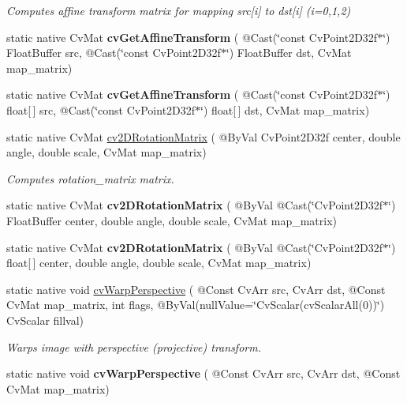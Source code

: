 \begin{DoxyCompactItemize}
\begin{DoxyCompactList}\small\item\em Computes affine transform matrix for mapping src\mbox{[}i\mbox{]} to dst\mbox{[}i\mbox{]} (i=0,1,2) \end{DoxyCompactList}\item 
static native Cv\+Mat {\bfseries cv\+Get\+Affine\+Transform} ( @Cast(\char`\"{}const Cv\+Point2\+D32f$\ast$\char`\"{}) Float\+Buffer src, @Cast(\char`\"{}const Cv\+Point2\+D32f$\ast$\char`\"{}) Float\+Buffer dst, Cv\+Mat map\+\_\+matrix)
\item 
static native Cv\+Mat {\bfseries cv\+Get\+Affine\+Transform} ( @Cast(\char`\"{}const Cv\+Point2\+D32f$\ast$\char`\"{}) float\mbox{[}$\,$\mbox{]} src, @Cast(\char`\"{}const Cv\+Point2\+D32f$\ast$\char`\"{}) float\mbox{[}$\,$\mbox{]} dst, Cv\+Mat map\+\_\+matrix)
\item 
static native Cv\+Mat \hyperlink{group__imgproc__c_ga8808b742ceec81dac792c107ef82fe13}{cv2\+D\+Rotation\+Matrix} ( @By\+Val Cv\+Point2\+D32f center, double angle, double scale, Cv\+Mat map\+\_\+matrix)
\begin{DoxyCompactList}\small\item\em Computes rotation\+\_\+matrix matrix. \end{DoxyCompactList}\item 
static native Cv\+Mat {\bfseries cv2\+D\+Rotation\+Matrix} ( @By\+Val @Cast(\char`\"{}Cv\+Point2\+D32f$\ast$\char`\"{}) Float\+Buffer center, double angle, double scale, Cv\+Mat map\+\_\+matrix)
\item 
static native Cv\+Mat {\bfseries cv2\+D\+Rotation\+Matrix} ( @By\+Val @Cast(\char`\"{}Cv\+Point2\+D32f$\ast$\char`\"{}) float\mbox{[}$\,$\mbox{]} center, double angle, double scale, Cv\+Mat map\+\_\+matrix)
\item 
static native void \hyperlink{group__imgproc__c_ga77d2f4184f964c0a75b65d576b0fd417}{cv\+Warp\+Perspective} ( @Const Cv\+Arr src, Cv\+Arr dst, @Const Cv\+Mat map\+\_\+matrix, int flags, @By\+Val(null\+Value=\char`\"{}Cv\+Scalar(cv\+Scalar\+All(0))\char`\"{}) Cv\+Scalar fillval)
\begin{DoxyCompactList}\small\item\em Warps image with perspective (projective) transform. \end{DoxyCompactList}\item 
static native void {\bfseries cv\+Warp\+Perspective} ( @Const Cv\+Arr src, Cv\+Arr dst, @Const Cv\+Mat map\+\_\+matrix)
\item 

\end{DoxyCompactItemize}
